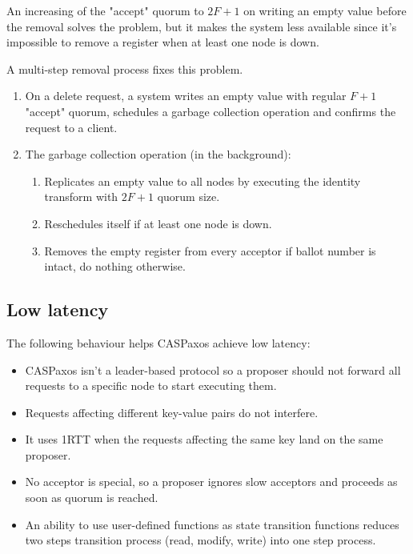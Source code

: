 \documentclass[12pt]{article}
\theoremstyle{definition}
\begin{document}
An increasing of the "accept" quorum to $2F+1$ on writing an empty value before the removal solves the problem, but it makes the system less available since it's impossible to remove a register when at least one node is down.

A multi-step removal process fixes this problem.

\begin{enumerate}
  \item On a delete request, a system writes an empty value with regular $F+1$ "accept" quorum, schedules a garbage collection operation and confirms the request to a client.
  \item The garbage collection operation (in the background):
  \begin{enumerate}
    \item Replicates an empty value to all nodes by executing the identity transform with $2F+1$ quorum size.
    \item Reschedules itself if at least one node is down.
    \item Removes the empty register from every acceptor if ballot number is intact, do nothing otherwise.
  \end{enumerate}
\end{enumerate}

\newpage

\subsection{Low latency}

The following behaviour helps CASPaxos achieve low latency:
\begin{itemize}[noitemsep]
  \item CASPaxos isn't a leader-based protocol so a proposer should not forward all requests to a specific node to start executing them.
  \item Requests affecting different key-value pairs do not interfere.
  \item It uses 1RTT when the requests affecting the same key land on the same proposer.
  \item No acceptor is special, so a proposer ignores slow acceptors and proceeds as soon as quorum is reached.
  \item An ability to use user-defined functions as state transition functions reduces two steps transition process (read, modify, write) into one step process.
\end{itemize}
\end{document}
